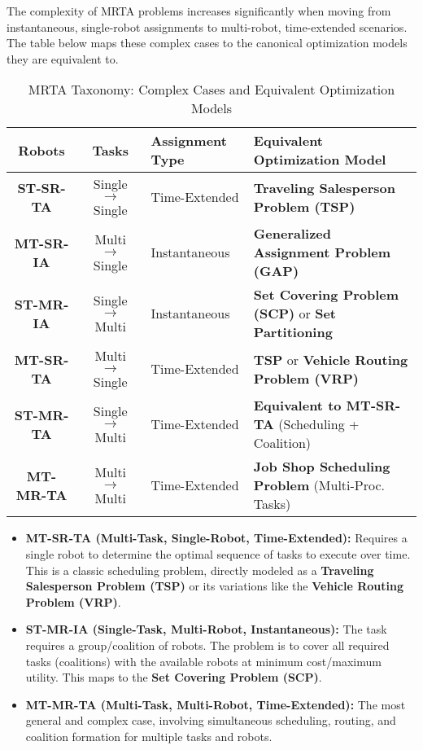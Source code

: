 \documentclass{report}
\begin{document}
The complexity of MRTA problems increases significantly when moving from instantaneous, single-robot assignments to multi-robot, time-extended scenarios. The table below maps these complex cases to the canonical optimization models they are equivalent to.

\renewcommand{\arraystretch}{1.2}
\begin{table}[h]
    \centering
    \caption{MRTA Taxonomy: Complex Cases and Equivalent Optimization Models}
    \begin{tabular}{|c|c|l|l|}
    \hline
    \textbf{Robots} & \textbf{Tasks} & \textbf{Assignment Type} & \textbf{Equivalent Optimization Model} \\
    \hline
    \textbf{ST-SR-TA} & Single $\to$ Single & Time-Extended & \textbf{Traveling Salesperson Problem (TSP)} \\
    \hline
    \textbf{MT-SR-IA} & Multi $\to$ Single & Instantaneous & \textbf{Generalized Assignment Problem (GAP)} \\
    \hline
    \textbf{ST-MR-IA} & Single $\to$ Multi & Instantaneous & \textbf{Set Covering Problem (SCP)} or \textbf{Set Partitioning} \\
    \hline
    \textbf{MT-SR-TA} & Multi $\to$ Single & Time-Extended & \textbf{TSP} or \textbf{Vehicle Routing Problem (VRP)} \\
    \hline
    \textbf{ST-MR-TA} & Single $\to$ Multi & Time-Extended & \textbf{Equivalent to MT-SR-TA} (Scheduling + Coalition) \\
    \hline
    \textbf{MT-MR-TA} & Multi $\to$ Multi & Time-Extended & \textbf{Job Shop Scheduling Problem} (Multi-Proc. Tasks) \\
    \hline
    \end{tabular}
    \label{tab:mrta_models}
\end{table}

\begin{itemize}
    \item \textbf{MT-SR-TA (Multi-Task, Single-Robot, Time-Extended):} Requires a single robot to determine the optimal sequence of tasks to execute over time. This is a classic scheduling problem, directly modeled as a \textbf{Traveling Salesperson Problem (TSP)} or its variations like the \textbf{Vehicle Routing Problem (VRP)}.
    \item \textbf{ST-MR-IA (Single-Task, Multi-Robot, Instantaneous):} The task requires a group/coalition of robots. The problem is to cover all required tasks (coalitions) with the available robots at minimum cost/maximum utility. This maps to the \textbf{Set Covering Problem (SCP)}.
    \item \textbf{MT-MR-TA (Multi-Task, Multi-Robot, Time-Extended):} The most general and complex case, involving simultaneous scheduling, routing, and coalition formation for multiple tasks and robots.
\end{itemize}
\end{document}
